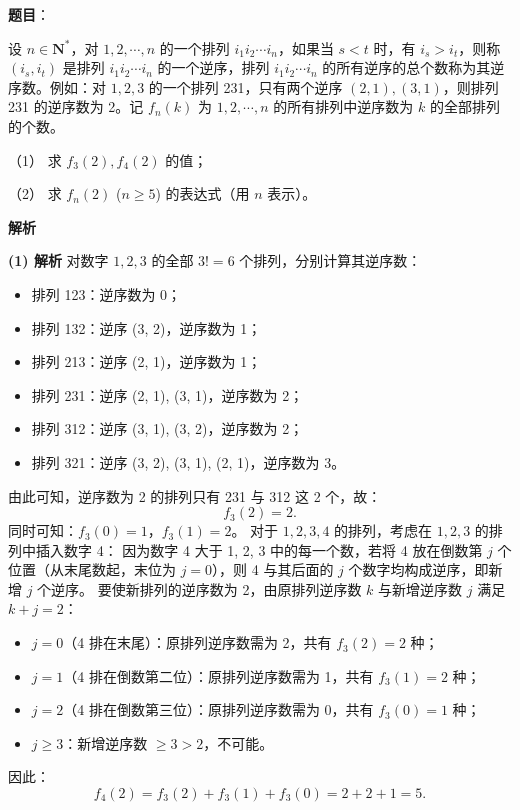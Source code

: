 \begin{answer}

\textbf{题目}：

设 $n \in \mathbf{N}^*$，对 $1, 2, \cdots, n$ 的一个排列 $i_1 i_2 \cdots i_n$，如果当 $s < t$ 时，有 $i_s > i_t$，则称 $(i_s, i_t)$ 是排列 $i_1 i_2 \cdots i_n$ 的一个逆序，排列 $i_1 i_2 \cdots i_n$ 的所有逆序的总个数称为其逆序数。例如：对 $1, 2, 3$ 的一个排列 231，只有两个逆序 $(2, 1), (3, 1)$，则排列 231 的逆序数为 2。记 $f_n(k)$ 为 $1, 2, \cdots, n$ 的所有排列中逆序数为 $k$ 的全部排列的个数。

（1） 求 $f_3(2), f_4(2)$ 的值；

（2） 求 $f_n(2)$ ($n \geqslant 5$) 的表达式（用 $n$ 表示）。

\textbf{解析}

\textbf{(1) 解析}
对数字 $1, 2, 3$ 的全部 $3! = 6$ 个排列，分别计算其逆序数：
\begin{itemize}
\item 排列 123：逆序数为 0；
\item 排列 132：逆序 (3, 2)，逆序数为 1；
\item 排列 213：逆序 (2, 1)，逆序数为 1；
\item 排列 231：逆序 (2, 1), (3, 1)，逆序数为 2；
\item 排列 312：逆序 (3, 1), (3, 2)，逆序数为 2；
\item 排列 321：逆序 (3, 2), (3, 1), (2, 1)，逆序数为 3。
\end{itemize}
由此可知，逆序数为 2 的排列只有 231 与 312 这 2 个，故：
\nopagebreak[4]
\[f_3(2) = 2.\]
同时可知：$f_3(0) = 1$，$f_3(1) = 2$。
对于 $1, 2, 3, 4$ 的排列，考虑在 $1, 2, 3$ 的排列中插入数字 4：
因为数字 4 大于 1, 2, 3 中的每一个数，若将 4 放在倒数第 $j$ 个位置（从末尾数起，末位为 $j = 0$），则 4 与其后面的 $j$ 个数字均构成逆序，即新增 $j$ 个逆序。
要使新排列的逆序数为 2，由原排列逆序数 $k$ 与新增逆序数 $j$ 满足 $k + j = 2$：
\begin{itemize}
\item $j = 0$（4 排在末尾）：原排列逆序数需为 2，共有 $f_3(2) = 2$ 种；
\item $j = 1$（4 排在倒数第二位）：原排列逆序数需为 1，共有 $f_3(1) = 2$ 种；
\item $j = 2$（4 排在倒数第三位）：原排列逆序数需为 0，共有 $f_3(0) = 1$ 种；
\item $j \geqslant 3$：新增逆序数 $\geqslant 3 > 2$，不可能。
\end{itemize}
因此：
\nopagebreak[4]
\[f_4(2) = f_3(2) + f_3(1) + f_3(0) = 2 + 2 + 1 = 5.\]


\end{answer}
